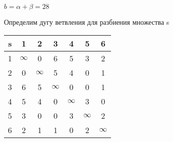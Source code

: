 \documentclass[a4paper,10pt]{report} %
\begin{document}
$b = \alpha + 	\beta = 28$

\newpage


\captionsetup{justification=raggedright,
singlelinecheck=false
}

\captionsetup[subfloat]{labelformat=empty}


Определим дугу ветвления для разбиения множества  s\\
\begin{flushleft}\begin{tabular}[]{|c|c|c|c|c|c|c|}
\hline
s & 1 & 2 & 3 & 4 & 5 & 6\\
\hline
1 & $\infty$ &      0 &      6 &      5 &      3 &      2\\
\hline
2 &      0 & $\infty$ &      5 &      4 &      0 &      1\\
\hline
3 &      6 &      5 & $\infty$ &      0 &      0 &      1\\
\hline
4 &      5 &      4 &      0 & $\infty$ &      3 &      0\\
\hline
5 &      3 &      0 &      0 &      3 & $\infty$ &      2\\
\hline
6 &      2 &      1 &      1 &      0 &      2 & $\infty$\\
\hline
\end{tabular}
\end{flushleft}
\end{document}
